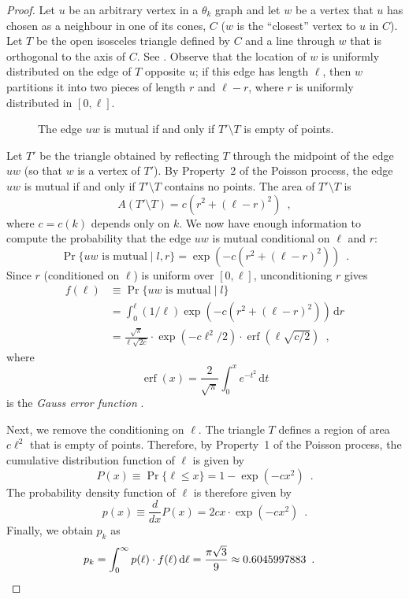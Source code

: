 \documentclass{patmorin}
\DeclareMathOperator{\erf}{erf}
\begin{document}
\begin{proof}
  Let $u$ be an arbitrary vertex in a $\theta_k$ graph and let $w$
  be a vertex that $u$ has chosen as a neighbour in one of its cones,
  $C$ ($w$ is the ``closest'' vertex to $u$ in $C$).  Let $T$ be the
  open isosceles triangle defined by $C$ and a line
  through $w$ that is orthogonal to the axis of $C$. See .
  Observe that the location of $w$ is uniformly distributed on the
  edge of $T$ opposite $u$;  if this edge has length $\ell$, then $w$
  partitions it into two pieces of length $r$ and $\ell-r$, where $r$
  is uniformly distributed in $[0,\ell]$.

  \begin{figure}
    \caption{The edge $uw$ is mutual if and only if $T'\setminus T$ 
       is empty of points.}
  \end{figure}
 
  Let $T'$ be the triangle obtained by reflecting $T$ through the midpoint
  of the edge $uw$ (so that $w$ is a vertex of $T'$). By Property~2 of the
  Poisson process, the edge $uw$ is mutual if and only if $T'\setminus T$
  contains no points.  The area of $T'\setminus T$ is
  \[
     A(T'\setminus T) = c(r^2+(\ell-r)^2)  \enspace ,
  \]
  where $c=c(k)$ depends only on $k$.  We now have enough information
  to compute the probability that the edge $uw$ is mutual conditional
  on $\ell$ and $r$:
  \[
    \Pr\{\mbox{$uw$ is mutual} \mid l,r\} = \exp(-c(r^2+(\ell-r)^2))
      \enspace .
  \]
  Since $r$ (conditioned on $\ell$) is uniform over $[0,\ell]$, unconditioning
  $r$ gives
  \begin{align*}
    f(\ell) & \equiv \Pr\{\mbox{$uw$ is mutual} \mid l\} \\
     & = \int_0^\ell (1/\ell)\exp(-c(r^2+(\ell-r)^2))\,\mathrm{d}r \\
     & = \frac{\sqrt{\pi}}{\ell\sqrt{2c}}
            \cdot\exp(-c\ell^2/2)
            \cdot\erf(\ell\sqrt{c/2})  \enspace ,
  \end{align*}
  where 
  \[ \erf(x)=\frac{2}{\sqrt{\pi}}\int_0^x e^{-t^2}\,\mathrm{d}t \]
  is the \emph{Gauss error function} \cite{gauss-error}.  

  Next, we remove the conditioning on $\ell$.  The triangle $T$ defines a
  region of area $c\ell^2$ that is empty of points.  Therefore,
  by Property~1 of the Poisson process, the cumulative distribution
  function of $\ell$ is given by
  \[
    P(x) \equiv \Pr\{\ell \le x\} = 1-\exp(-cx^2) \enspace .
  \]
  The probability density function of $\ell$ is therefore given by 
  \[
     p(x) \equiv \frac{d}{dx}P(x) =
     2cx\cdot\exp(-cx^2) \enspace .
  \]
  Finally, we obtain $p_k$ as 
  \begin{align*}
     p_k = \int_0^\infty p(\ell)\cdot f(\ell)\,\mathrm{d}\ell 
     = \frac{\pi\sqrt{3}}{9}
      \approx 0.6045997883  \enspace . & \qedhere
  \end{align*}
\end{proof}
\end{document}
